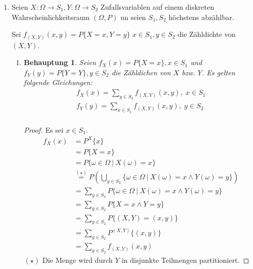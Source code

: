 \documentclass[a4paper]{scrartcl}
\newtheorem*{behaupt}{Behauptung}
\begin{document}
\begin{enumerate}[label=\bfseries\arabic*.]
\begin{enumerate}[label=(\alph*)]
        \end{enumerate}

    \item
        Seien $X \colon \Omega \to S_1, Y \colon \Omega \to S_2$
        Zufallsvariablen auf einem diskreten Wahrscheinlichkeitsraum
        $(\Omega, P)$ un seien $S_1, S_2$ höchstens abzählbar.

        Sei $f_{(X,Y)}(x,y) = P\{X = x, Y = y\}\; x \in S_1, y \in S_2$ die
        Zähldichte von $(X, Y)$.
        \begin{enumerate}[label=(\alph*)]
            \item
                \begin{behaupt}
                    Seien $f_X(x) = P\{X = x\}, x \in S_1$ und
                    $f_Y(y) = P\{Y = Y\}, y \in S_2$ die Zähldichen von $X$ bzw.
                    $Y$.
                    Es gelten folgende Gleichungen:
                    \begin{align*}
                    f_X(x) = \sum_{y \in S_2} f_{(X,Y)}(x, y), \; x \in S_1 \\
                    f_Y(y) = \sum_{x \in S_1} f_{(X,Y)}(x, y), \; y \in S_2 \\
                    \end{align*}
                \end{behaupt}
                \begin{proof}
                    Es sei $x \in S_1$.
                    \begin{equation*}
                        \begin{split}
                            f_X(x) &= P^X\{ x \} \\
                            &= P\{ X = x \} \\
                            &= P\{ \omega \in \Omega \ |\ X(\omega) = x \} \\
                            &\stackrel{(\star)}{=} P \left( \bigcup_{y \in S_2}
                                \{ \omega \in \Omega \ |\ X(\omega) = x
                                \land Y(\omega) = y \} \right) \\
                            &= \sum_{y \in S_2} P \{ \omega \in \Omega \ |\ 
                                X(\omega) = x \land Y(\omega) = y \} \\
                            &= \sum_{y \in S_2} P \{ X = x \land Y = y \} \\
                            &= \sum_{y \in S_2} P \{ (X, Y) = (x, y) \} \\
                            &= \sum_{y \in S_2} P^{(X, Y)} \{ (x, y) \} \\
                            &= \sum_{y \in S_2} f_{(X, Y)} (x, y)
                        \end{split}
                    \end{equation*}
                    $(\star)$ Die Menge wird durch $Y$ in disjunkte Teilmengen
                    partitioniert.


\end{proof}
\end{enumerate}
\end{enumerate}
\end{document}
